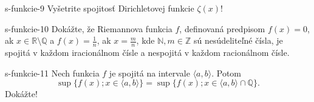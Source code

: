   \begin{defproblem}{s-funkcie-9}
  Vyšetrite spojitosť Dirichletovej funkcie $\zeta (x)$!
  \end{defproblem}

  \begin{defproblem}{s-funkcie-10}
  Dokážte, že Riemannova funkcia $f$, definovaná predpisom $f(x)=0$, ak $x \in \mathbb{R} \setminus \mathbb{Q}$ a $f(x)=\frac{1}{n}$, ak $x=\frac{m}{n}$, kde $\mathbb{N}, m \in \mathbb{Z}$ sú nesúdeliteľné čísla, je spojitá v každom iracionálnom čísle a nespojitá v každom racionálnom čísle.
  \end{defproblem}

  \begin{defproblem}{s-funkcie-11}
  Nech funkcia $f$ je spojitá na intervale $\langle a,b \rangle$. Potom $$\sup \{f(x); x \in \langle a,b \rangle\}= \sup \{f(x); x \in \langle a,b \rangle \cap \mathbb{Q}\}.$$ Dokážte!
  \end{defproblem}

